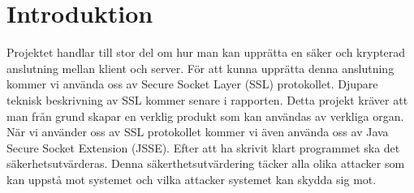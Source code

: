 \section{Introduktion}
Projektet handlar till stor del om hur man kan upprätta en säker och krypterad anslutning mellan klient och server. För att kunna upprätta denna anslutning kommer vi använda oss av Secure Socket Layer (SSL) protokollet. Djupare teknisk beskrivning av SSL kommer senare i rapporten. Detta projekt kräver att man från grund skapar en verklig produkt som kan användas av verkliga organ. När vi använder oss av SSL protokollet kommer vi även använda oss av Java Secure Socket Extension (JSSE). Efter att ha skrivit klart programmet ska det säkerhetsutvärderas. Denna säkerthetsutvärdering täcker alla olika attacker som kan uppstå mot systemet och vilka attacker systemet kan skydda sig mot. 